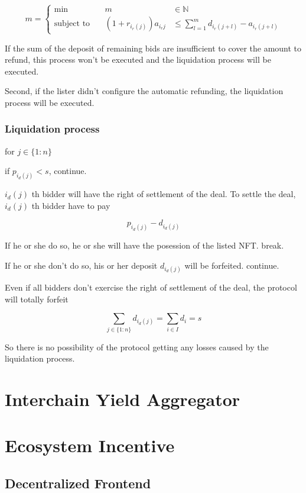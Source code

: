 \documentclass[dvipdfmx]{jsarticle}
\begin{document}
$$
  m = \left\{\begin{aligned}
    \min && \ m & \in \mathbb{N} \\
    \text{subject to} && \ (1 + r_{i_r(j)}) a_{i_r{j}} & \le \sum_{l=1}^m {d_{i_r(j+l)} - a_{i_r(j+l)}}
  \end{aligned}\right.
$$

If the sum of the deposit of remaining bids are insufficient to cover the amount to refund, this process won't be executed and the liquidation process will be executed.

Second, if the lister didn't configure the automatic refunding, the liquidation process will be executed.

\subsubsection{Liquidation process}

for $j \in \{1:n\}$

if $p_{i_d(j)} < s$, continue.

$i_d(j)$ th bidder will have the right of settlement of the deal.
To settle the deal, $i_d(j)$ th bidder have to pay

$$
  p_{i_d(j)} - d_{i_d(j)}
$$

If he or she do so, he or she will have the posession of the listed NFT. break.

If he or she don't do so, his or her deposit $d_{i_d(j)}$ will be forfeited. continue.

Even if all bidders don't exercise the right of settlement of the deal,
the protocol will totally forfeit 

$$
  \sum_{j \in \{1:n\}} d_{i_d(j)} = \sum_{i \in I} d_i = s
$$

So there is no possibility of the protocol getting any losses caused by the liquidation process.

\section{Interchain Yield Aggregator}

\section{Ecosystem Incentive}

\subsection{Decentralized Frontend}
\end{document}
